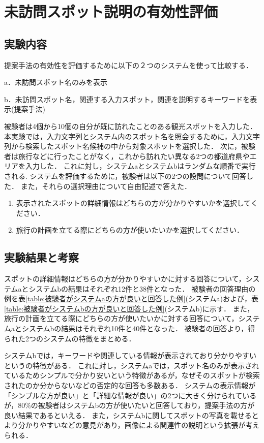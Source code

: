 \documentclass[submit]{ipsj}
\begin{document}
\section{未訪問スポット説明の有効性評価}
\label{sec:未訪問スポット説明の有効性評価}
\subsection{実験内容}
提案手法の有効性を評価するために以下の２つのシステムを使って比較する．
\begin{description}
  \item a．未訪問スポット名のみを表示
  \item b．未訪問スポット名，関連する入力スポット，関連を説明するキーワードを表示(提案手法)
\end{description}

被験者は4個から10個の自分が既に訪れたことのある観光スポットを入力した．
本実験では，入力文字列とシステム内のスポット名を照会するために，入力文字列から検索したスポット名候補の中から対象スポットを選択した．
次に，被験者は旅行などに行ったことがなく，これから訪れたい異なる2つの都道府県やエリアを入力した．
これに対し，システムaとシステムbはランダムな順番で実行される.
システムを評価するために，被験者は以下の2つの設問について回答した．
また，それらの選択理由について自由記述で答えた．
\begin{enumerate}
  \item 表示されたスポットの詳細情報はどちらの方が分かりやすいかを選択してください．
  \item 旅行の計画を立てる際にどちらの方が使いたいかを選択してください．
\end{enumerate}

\subsection{実験結果と考察}
スポットの詳細情報はどちらの方が分かりやすいかに対する回答について，システムaとシステムbの結果はそれぞれ12件と38件となった．
被験者の回答理由の例を表\ref{table:被験者がシステムaの方が良いと回答した例}(システムa)および，表\ref{table:被験者がシステムbの方が良いと回答した例}(システムb)に示す．
また，
旅行の計画を立てる際にどちらの方が使いたいかに対する回答について，システムaとシステムbの結果はそれぞれ10件と40件となった．
被験者の回答より，得られた2つのシステムの特徴をまとめる．

システムbでは，キーワードや関連している情報が表示されており分かりやすいというの特徴がある．
これに対し，システムaでは，スポット名のみが表示されているためシンプルで分かり安いという特徴があるが，なぜそのスポットが検索されたのか分からないなどの否定的な回答も多数ある．
システムの表示情報が「シンプルな方が良い」と「詳細な情報が良い」の2つに大きく分けられているが，80\%の被験者はシステムbの方が使いたいと回答しており，提案手法の方が良い結果であるといえる．
また，システムbに関してスポットの写真を載せるとより分かりやすいなどの意見があり，画像による関連性の説明という拡張が考えられる．
\end{document}

